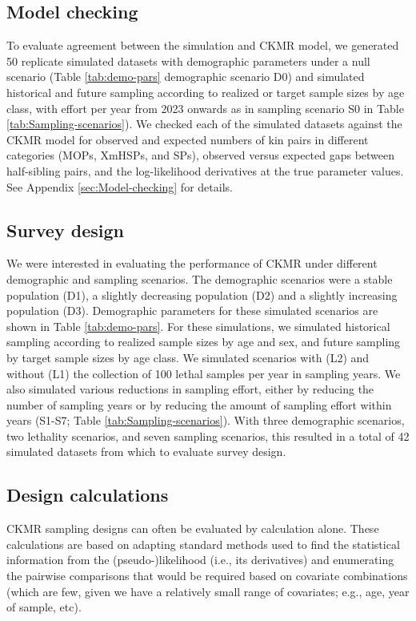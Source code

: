 \subsection{Model checking}

To evaluate agreement between the simulation and CKMR model, we generated
50 replicate simulated datasets with demographic parameters under
a null scenario (Table \ref{tab:demo-pars} demographic scenario D0)
and simulated historical and future sampling according to realized
or target sample sizes by age class, with effort per year from 2023
onwards as in sampling scenario S0 in Table \ref{tab:Sampling-scenarios}).
We checked each of the simulated datasets against the CKMR model for
observed and expected numbers of kin pairs in different categories
(MOPs, XmHSPs, and SPs), observed versus expected gaps between half-sibling
pairs, and the log-likelihood derivatives at the true parameter values.
See Appendix \ref{sec:Model-checking} for details.

\subsection{Survey design}

We were interested in evaluating the performance of CKMR under different
demographic and sampling scenarios. The demographic scenarios were
a stable population (D1), a slightly decreasing population (D2) and
a slightly increasing population (D3). Demographic parameters for
these simulated scenarios are shown in Table \ref{tab:demo-pars}.
For these simulations, we simulated historical sampling according
to realized sample sizes by age and sex, and future sampling by target
sample sizes by age class. We simulated scenarios with (L2) and without
(L1) the collection of 100 lethal samples per year in sampling years.
We also simulated various reductions in sampling effort, either by
reducing the number of sampling years or by reducing the amount of
sampling effort within years (S1-S7; Table \ref{tab:Sampling-scenarios}).
With three demographic scenarios, two lethality scenarios, and seven
sampling scenarios, this resulted in a total of 42 simulated datasets
from which to evaluate survey design.

\subsection{Design calculations}

CKMR sampling designs can often be evaluated by calculation alone.
These calculations are based on adapting standard methods used to
find the statistical information from the (pseudo-)likelihood (i.e.,
its derivatives) and enumerating the pairwise comparisons that would
be required based on covariate combinations (which are few, given
we have a relatively small range of covariates; e.g., age, year of
sample, etc).

